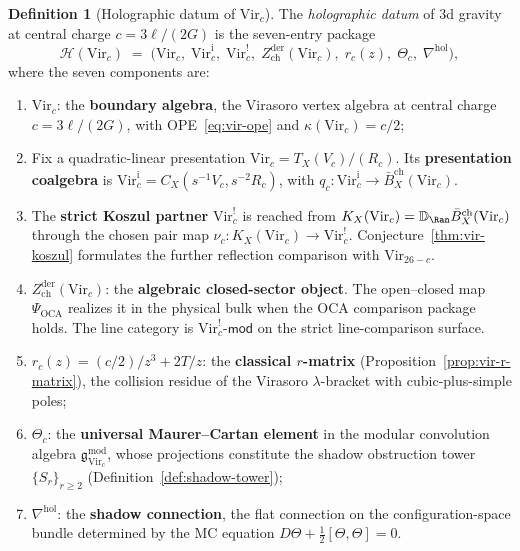 \documentclass[11pt,reqno]{amsart}
\theoremstyle{definition}
\newtheorem{definition}[theorem]{Definition}
\theoremstyle{remark}
\begin{document}
\begin{definition}[Holographic datum of $\mathrm{Vir}_c$]
\label{def:holographic-datum}
The \emph{holographic datum} of $3$d gravity at central charge
$c = 3\ell/(2G)$ is the seven-entry package
\begin{equation}\label{eq:holographic-datum}
\mathcal{H}(\mathrm{Vir}_c)
\;=\;
\bigl(
 \mathrm{Vir}_c,\;
 \mathrm{Vir}_c^{\mathrm i},\;
 \mathrm{Vir}_c^!,\;
 Z^{\mathrm{der}}_{\mathrm{ch}}(\mathrm{Vir}_c),\;
 r_c(z),\;
 \Theta_c,\;
 \nabla^{\mathrm{hol}}
\bigr),
\end{equation}
where the seven components are:
\begin{enumerate}[label=\textup{(\roman*)}]
\item $\mathrm{Vir}_c$: the \textbf{boundary algebra}, the
  Virasoro vertex algebra at central charge
  $c = 3\ell/(2G)$, with OPE~\eqref{eq:vir-ope} and
  $\kappa(\mathrm{Vir}_c) = c/2$;
\item Fix a quadratic-linear presentation
  \(\mathrm{Vir}_c=T_X(V_c)/(R_c)\).  Its
  \textbf{presentation coalgebra} is
  \(\mathrm{Vir}_c^{\mathrm i}=C_X(s^{-1}V_c,s^{-2}R_c)\), with
  \(q_c\colon\mathrm{Vir}_c^{\mathrm i}\to
  \bar B_X^{\mathrm{ch}}(\mathrm{Vir}_c)\).
\item The \textbf{strict Koszul partner} \(\mathrm{Vir}_c^!\)
  is reached from
  \(K_X(\mathrm{Vir}_c)=\mathbb D_{\Ran}
  \bar B_X^{\mathrm{ch}}(\mathrm{Vir}_c)\)
  through the chosen pair map
  \(\nu_c\colon K_X(\mathrm{Vir}_c)\to\mathrm{Vir}_c^!\).
  Conjecture~\textup{\ref{thm:vir-koszul}} formulates the further
  reflection comparison with \(\mathrm{Vir}_{26-c}\).
\item $Z^{\mathrm{der}}_{\mathrm{ch}}(\mathrm{Vir}_c)$: the
  \textbf{algebraic closed-sector object}.  The open--closed map
  \(\Psi_{\mathrm{OCA}}\) realizes it in the physical bulk when the
  OCA comparison package holds.  The line category is
  $\mathrm{Vir}_c^!\text{-}\mathsf{mod}$ on the strict
  line-comparison surface.
\item $r_c(z) = (c/2)/z^3 + 2T/z$: the \textbf{classical
  $r$-matrix}
  (Proposition~\textup{\ref{prop:vir-r-matrix}}), the
  collision residue of the Virasoro $\lambda$-bracket with
  cubic-plus-simple poles;
\item $\Theta_c$: the \textbf{universal Maurer--Cartan
  element} in the modular convolution algebra
  $\mathfrak{g}^{\mathrm{mod}}_{\mathrm{Vir}_c}$, whose
  projections constitute the shadow obstruction tower
  $\{S_r\}_{r \ge 2}$
  (Definition~\textup{\ref{def:shadow-tower}});
\item $\nabla^{\mathrm{hol}}$: the \textbf{shadow
  connection}, the flat connection on the configuration-space
  bundle determined by the MC equation
  $D\Theta + \frac{1}{2}[\Theta, \Theta] = 0$.
\end{enumerate}
\end{definition}
\end{document}
